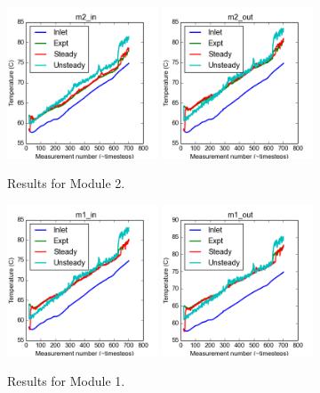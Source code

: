 \documentclass{article}
\begin{document}
\clearpage
\begin{figure}[!ht]
\centering
\includegraphics[width=0.4\textwidth]{../../data/ICSolar/images/Feb11_m2_in_compare.png}\hspace{0.05\textwidth}
\includegraphics[width=0.4\textwidth]{../../data/ICSolar/images/Feb11_m2_out_compare.png}\hspace{0.05\textwidth}\\
\caption{Results for Module 2.}\end{figure}
\begin{figure}[!ht]
\centering
\includegraphics[width=0.4\textwidth]{../../data/ICSolar/images/Feb11_m1_in_compare.png}\hspace{0.05\textwidth}
\includegraphics[width=0.4\textwidth]{../../data/ICSolar/images/Feb11_m1_out_compare.png}\hspace{0.05\textwidth}\\
\caption{Results for Module 1.}\end{figure}
\end{document}

